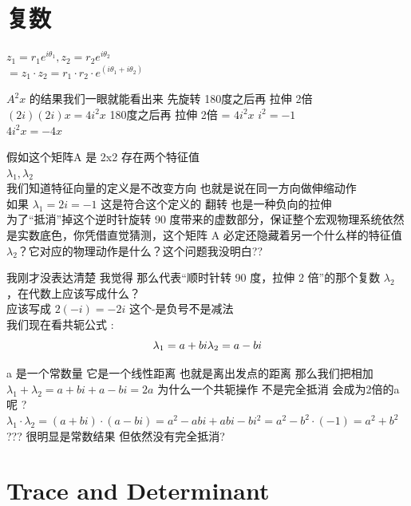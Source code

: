 \documentclass[12pt]{article}
\begin{document}
\section{复数}
$z_{1} = r_{1}e^{iθ_{1}}, z_{2} = r_{2}e^{iθ_{2}}$ \\
$ =  z_{1} \cdot z_{2} = r_{1} \cdot r_{2} \cdot e^{(iθ_{1} + iθ_{2})}$

$A^{2}x$ 的结果我们一眼就能看出来 先旋转 180度之后再 拉伸 2倍 \\
$(2i)(2i)x =  4i^{2}x$
180度之后再 拉伸 2倍 = $4i^{2}x$
$i^{2} = -1$ \\
$4i^{2}x = -4x$

假如这个矩阵A 是  2x2 存在两个特征值 \\
$ \lambda_{1} , \lambda_{2}$ \\
我们知道特征向量的定义是不改变方向 也就是说在同一方向做伸缩动作 \\
如果 $\lambda_{1} = 2i  = -1$ 这是符合这个定义的 翻转 也是一种负向的拉伸 \\
为了“抵消”掉这个逆时针旋转 90 度带来的虚数部分，保证整个宏观物理系统依然是实数底色，你凭借直觉猜测，这个矩阵
A 必定还隐藏着另一个什么样的特征值 $λ_{2}$	​？它对应的物理动作是什么？这个问题我没明白??

我刚才没表达清楚 我觉得 那么代表“顺时针转 90 度，拉伸 2 倍”的那个复数 $λ_{2}$ ，在代数上应该写成什么？\\
应该写成 $2(-i) = -2i$ 这个-是负号不是减法 \\
我们现在看共轭公式 :
\[
    \lambda_{1} = a + bi  \\
    \lambda_{2} = a - bi
\]

a 是一个常数量 它是一个线性距离 也就是离出发点的距离 那么我们把相加 \\
$ \lambda_{1} + \lambda_{2} =   a + bi  + a - bi  =  2a  $
为什么一个共轭操作 不是完全抵消 会成为2倍的a呢 ?
$ \lambda_{1} \cdot \lambda_{2} =   (a + bi)  \cdot (a - bi)  =
    a^{2} -abi + abi - bi^{2}  = a^{2} -b^{2} \cdot (-1)  = a^{2} + b^{2}$ ???
很明显是常数结果 但依然没有完全抵消?


\section{Trace and Determinant}
\end{document}
